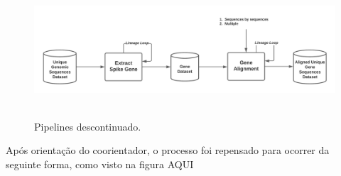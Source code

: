 \begin{figure}[htb]
  \centering
  \caption{Pipelines descontinuado.}
  \includegraphics[scale=0.45]{figuras/pipelines/pipelines_descontinuado.png}
  ~\label{fig:pipelinesDescontinuados}
\end{figure}

Após orientação do coorientador, o processo foi repensado para ocorrer da seguinte forma, como visto na figura AQUI

